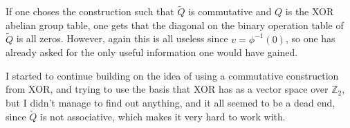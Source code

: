 If one choses the construction such that \( \tilde{Q} \) is commutative and \( Q \) is the XOR abelian group table, one gets that the diagonal on the binary operation table of \( \tilde{Q} \) is all zeros. However, again this is all useless since \( v = \phi^{-1}(0) \), so one has already asked for the only useful information one would have gained.

I started to continue building on the idea of using a commutative construction from XOR, and trying to use the basis that XOR has as a vector space over \( \mathbb{Z}_2 \), but I didn't manage to find out anything, and it all seemed to be a dead end, since \( \tilde{Q} \) is not associative, which makes it very hard to work with.